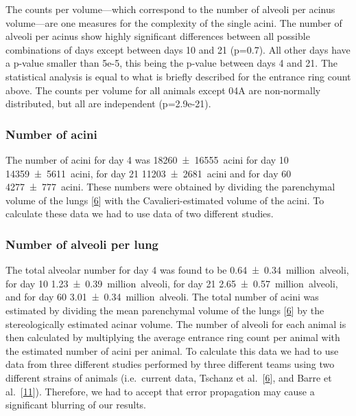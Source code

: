 \documentclass[
  american,
]{article}
\begin{document}
The counts per volume---which correspond to the number of alveoli per acinus volume---are one measures for the complexity of the single acini.
The number of alveoli per acinus show highly significant differences between all possible combinations of days except between days 10 and 21 (p=0.7).
All other days have a p-value smaller than 5e-5, this being the p-value between days 4 and 21.
The statistical analysis is equal to what is briefly described for the entrance ring count above.
The counts per volume for all animals except 04A are non-normally distributed, but all are independent (p=2.9e-21).

\hypertarget{number-of-acini}{%
\subsubsection{Number of acini}\label{number-of-acini}}

The number of acini for day 4 was 18260~±~16555~acini for day 10 14359~±~5611~acini, for day 21 11203~±~2681~acini and for day 60 4277~±~777~acini.
These numbers were obtained by dividing the parenchymal volume of the lungs {[}\protect\hyperlink{ref-wnl86DEM}{6}{]} with the Cavalieri-estimated volume of the acini.
To calculate these data we had to use data of two different studies.

\hypertarget{number-of-alveoli-per-lung}{%
\subsubsection{Number of alveoli per lung}\label{number-of-alveoli-per-lung}}

The total alveolar number for day 4 was found to be 0.64~±~0.34~million~alveoli, for day 10 1.23~±~0.39~million~alveoli, for day 21 2.65~±~0.57~million~alveoli, and for day 60 3.01~±~0.34~million~alveoli.
The total number of acini was estimated by dividing the mean parenchymal volume of the lungs {[}\protect\hyperlink{ref-wnl86DEM}{6}{]} by the stereologically estimated acinar volume.
The number of alveoli for each animal is then calculated by multiplying the average entrance ring count per animal with the estimated number of acini per animal.
To calculate this data we had to use data from three different studies performed by three different teams using two different strains of animals (i.e.~current data, Tschanz et al.~{[}\protect\hyperlink{ref-wnl86DEM}{6}{]}, and Barre et al.~{[}\protect\hyperlink{ref-uFNlWogb}{11}{]}).
Therefore, we had to accept that error propagation may cause a significant blurring of our results.
\end{document}
